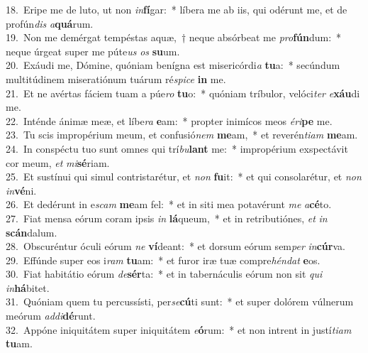{18.~}Eripe me de luto, ut non \textit{in}\textbf{fí}gar:~* líbera me ab iis, qui odérunt me, et de profún\textit{dis} \textit{a}\textbf{quá}rum.\\
{19.~}Non me demérgat tempéstas aquæ,~† neque absórbeat me \textit{pro}\textbf{fún}dum:~* neque úrgeat super me púte\textit{us} \textit{os} \textbf{su}um.\\
{20.~}Exáudi me, Dómine, quóniam benígna est misericórdi\textit{a} \textbf{tu}a:~* secúndum multitúdinem miseratiónum tuárum ré\textit{spi}\textit{ce} \textbf{in} me.\\
{21.~}Et ne avértas fáciem tuam a púe\textit{ro} \textbf{tu}o:~* quóniam tríbulor, velóci\textit{ter} \textit{e}\textbf{xáu}di me.\\
{22.~}Inténde ánimæ meæ, et líbe\textit{ra} \textbf{e}am:~* propter inimícos meos \textit{é}\textit{ri}\textbf{pe} me.\\
{23.~}Tu scis impropérium meum, et confusió\textit{nem} \textbf{me}am,~* et reverén\textit{ti}\textit{am} \textbf{me}am.\\
{24.~}In conspéctu tuo sunt omnes qui trí\textit{bu}\textbf{lant} me:~* impropérium exspectávit cor meum, \textit{et} \textit{mi}\textbf{sé}riam.\\
{25.~}Et sustínui qui simul contristarétur, et \textit{non} \textbf{fu}it:~* et qui consolarétur, et \textit{non} \textit{in}\textbf{vé}ni.\\
{26.~}Et dedérunt in e\textit{scam} \textbf{me}am fel:~* et in siti mea potavérunt \textit{me} \textit{a}\textbf{cé}to.\\
{27.~}Fiat mensa eórum coram ipsis \textit{in} \textbf{lá}queum,~* et in retributiónes, \textit{et} \textit{in} \textbf{scán}dalum.\\
{28.~}Obscuréntur óculi eórum \textit{ne} \textbf{ví}deant:~* et dorsum eórum sem\textit{per} \textit{in}\textbf{cúr}va.\\
{29.~}Effúnde super eos i\textit{ram} \textbf{tu}am:~* et furor iræ tuæ compre\textit{hén}\textit{dat} \textbf{e}os.\\
{30.~}Fiat habitátio eórum \textit{de}\textbf{sér}ta:~* et in tabernáculis eórum non sit \textit{qui} \textit{in}\textbf{há}bitet.\\
{31.~}Quóniam quem tu percussísti, per\textit{se}\textbf{cú}ti sunt:~* et super dolórem vúlnerum meórum \textit{ad}\textit{di}\textbf{dé}runt.\\
{32.~}Appóne iniquitátem super iniquitátem \textit{e}\textbf{ó}rum:~* et non intrent in justí\textit{ti}\textit{am} \textbf{tu}am.\\
